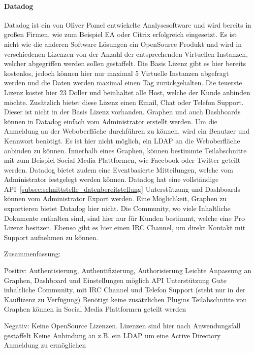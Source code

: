 \paragraph{Datadog}
\label{paragraph:datadog}
Datadog ist ein von Oliver Pomel entwickelte Analysesoftware und wird bereits
in großen Firmen, wie zum Beispiel EA oder Citrix erfolgreich eingesetzt. Es
ist nicht wie die anderen Software Lösungen ein OpenSource Produkt und wird in
verschiedenen Lizenzen von der Anzahl der entsprechenden Virtuellen Instanzen,
welcher abgegriffen werden sollen gestaffelt. Die Basis Lizenz gibt es hier
bereits kostenlos, jedoch können hier nur maximal 5 Virtuelle Instanzen
abgefragt werden und die Daten werden maximal einen Tag zurückgehalten. Die
teuerste Lizenz kostet hier 23 Doller und beinhaltet alle Host, welche der Kunde
anbinden möchte. Zusätzlich bietet diese Lizenz einen Email, Chat oder Telefon
Support. Dieser ist nicht in der Basis Lizenz vorhanden. Graphen und auch
Dashboards können in Datadog einfach vom Administrator erstellt werden. Um die
Anmeldung an der Weboberfläche durchführen zu können, wird ein Benutzer und
Kennwort benötigt. Es ist hier nicht möglich, ein LDAP an die Weboberfläche
anbinden zu können. Innerhalb eines Graphen, können bestimmte Teilabschnitte mit
zum Beispiel Social Media Plattformen, wie Facebook oder Twitter geteilt werden.
Datadog bietet zudem eine Eventbasierte Mitteilungen, welche vom Administrator
festgelegt werden können. Datadog hat eine vollständige
API~\ref{subsec:schnittstelle_datenbereitstellung} Unterstützung und Dashboards
können vom Administrator Export werden. Eine Möglichkeit, Graphen zu exportieren
bietet Datadog hier nicht. Die Community, wo viele Inhaltliche Dokumente
enthalten sind, sind hier nur für Kunden bestimmt, welche eine Pro Lizenz
besitzen. Ebenso gibt es hier einen IRC Channel, um direkt Kontakt mit Support
aufnehmen zu können.

Zusammenfassung:
\begin{outline}
  Positiv:
  \1 Authentisierung, Authentifizierung, Authorisierung
  \1 Leichte Anpassung an Graphen, Dashboard und Einstellungen möglich
  \1 API Unterstützung
  \1 Gute inhaltliche Community, mit IRC Channel und Telefon Support (steht
  nur in der Kauflizenz zu Verfügung)
  \1 Benötigt keine zusätzlichen Plugins
  \1 Teilabschnitte von Graphen können in Social Media Plattformen geteilt
  werden

  Negativ:
  \1 Keine OpenSource Lizenzen. Lizenzen sind hier nach Anwendungsfall
  gestaffelt
  \1 Keine Anbindung an z.B. ein LDAP um eine Active Directory Anmeldung zu
  ermöglichen
\end{outline}

